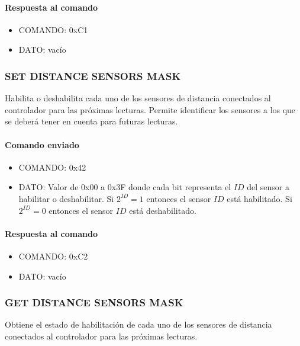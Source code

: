 \paragraph*{Respuesta al comando}

\begin{itemize}
	\item{COMANDO:} 0xC1
	\item{DATO:} vac\'io
\end{itemize}

\subsubsection{SET DISTANCE SENSORS MASK}
\label{hA_protocolo_enable_distance_sensors}

Habilita o deshabilita cada uno de los sensores de distancia conectados al controlador para las pr\'oximas lecturas.
Permite identificar los sensores a los que se deber\'a tener en cuenta para futuras lecturas.

\paragraph*{Comando enviado}

\begin{itemize}
	\item{COMANDO:} 0x42
	\item{DATO:} Valor de 0x00 a 0x3F donde cada bit representa el $ID$ del sensor a habilitar o deshabilitar.
	Si $2^{ID} = 1$ entonces el sensor $ID$ est\'a habilitado.
	Si $2^{ID} = 0$ entonces el sensor $ID$ est\'a deshabilitado.
\end{itemize}

\paragraph*{Respuesta al comando}

\begin{itemize}
	\item{COMANDO:} 0xC2
	\item{DATO:} vac\'io
\end{itemize}

\subsubsection{GET DISTANCE SENSORS MASK}
\label{hA_protocolo_get_status_distance_sensors}

Obtiene el estado de habilitaci\'on de cada uno de los sensores de distancia conectados al controlador para las pr\'oximas lecturas.

